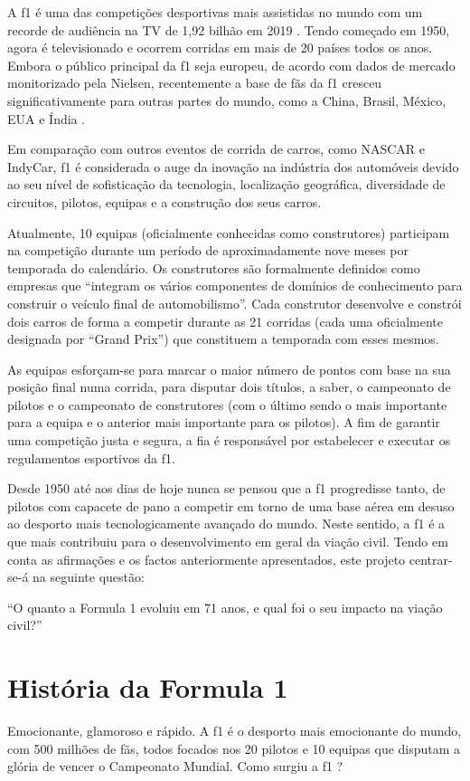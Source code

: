 \documentclass{report}
\begin{document}
A \ac{f1} é uma das competições desportivas mais assistidas no mundo com um recorde de audiência na TV de 1,92 bilhão em 2019 \cite{intro}. Tendo começado em 1950, agora é televisionado e ocorrem corridas em mais de 20 países todos os anos. Embora o público principal da \ac{f1} seja europeu, de acordo com dados de mercado monitorizado pela Nielsen, recentemente a base de fãs da \ac{f1} cresceu significativamente para outras partes do mundo, como a China, Brasil, México, EUA e Índia \cite{intro}. 


Em comparação com outros eventos de corrida de carros, como NASCAR e IndyCar, \ac{f1} é considerada o auge da inovação na indústria dos automóveis devido ao seu nível de sofisticação da tecnologia, localização geográfica, diversidade de circuitos, pilotos, equipas e a construção dos seus carros.


 Atualmente, 10 equipas (oficialmente conhecidas como construtores) participam na competição durante um período de aproximadamente nove meses por temporada do calendário. Os construtores são formalmente definidos como empresas que “integram os vários componentes de domínios de conhecimento para construir o veículo final de automobilismo”. Cada construtor desenvolve e constrói dois carros de forma a competir durante as 21 corridas (cada uma oficialmente designada por “Grand Prix”) que constituem a temporada com esses mesmos. 
 
 
 As equipas esforçam-se para marcar o maior número de pontos com base na sua posição final numa corrida, para disputar dois títulos, a saber, o campeonato de pilotos e o campeonato de construtores (com o último sendo o mais importante para a equipa e o anterior mais importante para os pilotos). A fim de garantir uma competição justa e segura, a \ac{fia} é responsável por estabelecer e executar os regulamentos esportivos da \ac{f1}.


Desde 1950 até aos dias de hoje nunca se pensou que a \ac{f1} progredisse tanto, de pilotos com capacete de pano a competir em torno de uma base aérea em desuso ao desporto mais tecnologicamente avançado do mundo. Neste sentido, a \ac{f1} é a que mais contribuiu para o desenvolvimento em geral da viação civil. Tendo em conta as afirmações e os factos anteriormente apresentados, este projeto centrar-se-á na seguinte questão:
\begin{center}
“O quanto a Formula 1 evoluiu em 71 anos, e qual foi o seu impacto na viação civil?”
\end{center}


\chapter{História da Formula 1}
Emocionante, glamoroso e rápido. A \ac{f1} é o desporto mais emocionante 
do mundo, com 500 milhões de fãs, todos focados nos 20 pilotos e 10 equipas que disputam a glória de vencer o Campeonato Mundial.
Como surgiu a \ac{f1} \cite{hist}?
\end{document}
